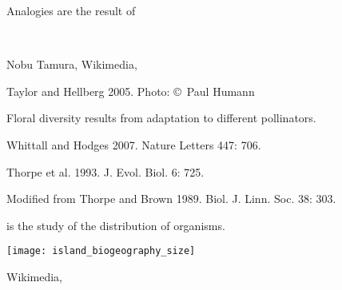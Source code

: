 \documentclass[t]{beamer}
\begin{document}
%
{
\begin{frame}[t]{Analogies are the result of }

	\vspace{3.85cm}

	\tiny \textcolor{white}{Alexander Vasenin, Wikimedia, 
	\hfill Terry Goos, Wikimedia, }

	\vfilll

	\tiny Nobu Tamura, Wikimedia,  \hfill \textcolor{white}{Ken Funakoshi, Wikimedia, }

\end{frame}
}
%
{
\begin{frame}[b]

	\tiny  Taylor and Hellberg 2005. \hfill Photo: \copyright~Paul Humann

\end{frame}
}

{
\begin{frame}[b]{Floral diversity results from adaptation to different pollinators.}

	\hfill \tiny  Whittall and Hodges 2007. Nature Letters 447: 706.

\end{frame}
}
%
{
\begin{frame}[b]

	\hfill \tiny  Thorpe et al. 1993. J. Evol. Biol. 6: 725.

\end{frame}
}
%
{
\begin{frame}[b]

	\hfill \tiny  Modified from Thorpe and Brown 1989. Biol. J. Linn. Soc. 38: 303.

\end{frame}
}
%
\begin{frame}[t]{ is the study of the distribution of organisms.}

	\texttt{[image: island\_biogeography\_size]}

	\vfilll
	
	\hfill \tiny Wikimedia, 
\end{frame}
\end{document}
